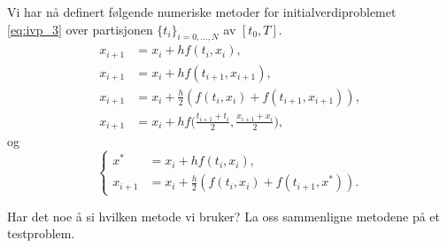 \documentclass{article}
\theoremstyle{plain}
\theoremstyle{definition}
\theoremstyle{remark}
\newenvironment{defn}
{\pushQED{\qed}\renewcommand{\qedsymbol}{$\triangle$}\defnx}
{\popQED\enddefnx}
\newcommand{\fcn}{x}
\newcommand{\biggparanth}[1]{\bigg(#1\bigg)}
\begin{document}
\begin{defn}
    Vi har nå definert følgende numeriske metoder for initialverdiproblemet \eqref{eq:ivp_3} over partisjonen $\{t_i\}_{i = 0, ..., N}$ av $[t_0, T]$.
    \begin{align}
        \fcn_{i + 1} & = \fcn_i + h f(t_i, \fcn_i), \tag{Euler eksplisitt} \\
        \fcn_{i + 1} & = \fcn_i + h f(t_{i+1}, \fcn_{i+1}), \tag{Euler implisitt} \\
        \fcn_{i + 1} & = \fcn_i + \frac{h}{2} (f(t_{i}, \fcn_{i}) + f(t_{i+1}, \fcn_{i+1})), \tag{trapesmetoden} \\
        \fcn_{i + 1} & = \fcn_i + h f\biggparanth{\frac{t_{i+1} + t_i}{2}, \frac{\fcn_{i+1} + \fcn_i}{2}}, \tag{midtpunktmetoden}
    \end{align}
    og
    \begin{equation} \tag{Hens metode}
        \left\{
            \begin{aligned}
                \fcn^* & = \fcn_i + h f(t_i, \fcn_i), \\
                \fcn_{i + 1} & = \fcn_i + \frac{h}{2} (f(t_{i}, \fcn_{i}) + f(t_{i+1}, \fcn^*)).
            \end{aligned}
            \right.
        \end{equation}
\end{defn}
        
Har det noe å si hvilken metode vi bruker? La oss sammenligne metodene på et testproblem.
\end{document}
